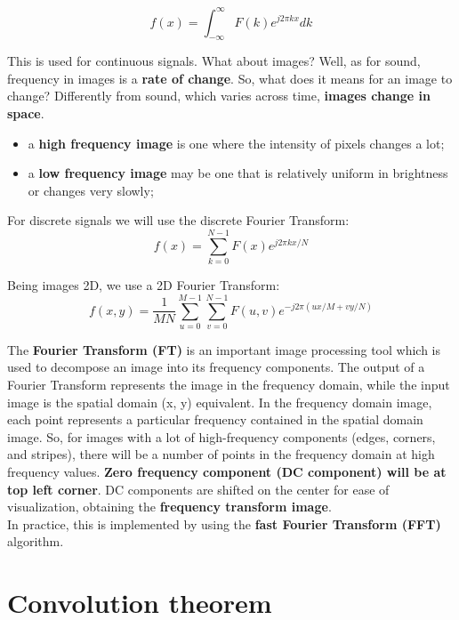 \documentclass{article}
\begin{document}
\begin{equation*}
    f(x) = \int_{-\infty}^{\infty}F(k) e^{j2\pi kx}dk
\end{equation*}

This is used for continuous signals. What about images? Well, as for sound, frequency in images is a \textbf{rate of change}. So, what does it means for an image to change? Differently from sound, which varies across time, \textbf{images change in space}.

\begin{itemize}
    \item a \textbf{high frequency image} is one where the intensity of pixels changes a lot;
    \item a \textbf{low frequency image} may be one that is relatively uniform in brightness or changes very slowly;
\end{itemize}

\newpage

For discrete signals we will use the discrete Fourier Transform:
\begin{equation*}
    f(x) = \sum_{k=0}^{N-1} F(x) e^{j2\pi kx / N}
\end{equation*}

Being images 2D, we use a 2D Fourier Transform:
\begin{equation*}
    f(x,y) = \frac{1}{MN}\sum_{u=0}^{M-1} \sum_{v=0}^{N-1} F(u, v) e^{-j2\pi(ux/M + vy/N)}
\end{equation*}

The \textbf{Fourier Transform (FT)} is an important image processing tool which is used to decompose an image into its frequency components. The output of a Fourier Transform represents the image in the frequency domain, while the input image is the spatial domain (x, y) equivalent. In the frequency domain image, each point represents a particular frequency contained in the spatial domain image. So, for images with a lot of high-frequency components (edges, corners, and stripes), there will be a number of points in the frequency domain at high frequency values. \textbf{Zero frequency component (DC component) will be at top left corner}. DC components are shifted on the center for ease of visualization, obtaining the \textbf{frequency transform image}.\\ 

In practice, this is implemented by using the \textbf{fast Fourier Transform (FFT)} algorithm.

\newpage

\section*{Convolution theorem}
\end{document}
